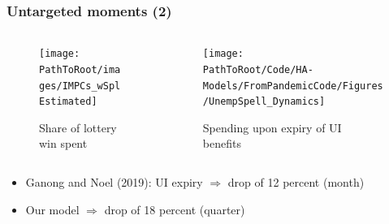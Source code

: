 \documentclass[pdflatex,aspectratio=169]{beamer}
\begin{document}
\begin{frame}
  \frametitle{Untargeted moments (2)}
  \begin{columns}
    \begin{column}{0.50\textwidth}
      \begin{figure}
        \texttt{[image: \\PathToRoot/images/IMPCs\_wSplEstimated]}
        \caption{Share of lottery win spent} 
      \end{figure}
    \end{column}
    \begin{column}{0.50\textwidth}
      \begin{figure}
        \texttt{[image: \\PathToRoot/Code/HA-Models/FromPandemicCode/Figures/UnempSpell\_Dynamics]}
        \caption{Spending upon expiry of UI benefits} 
      \end{figure}
    \end{column}
  \end{columns}
  \begin{itemize}
    \item
          Ganong and Noel (2019): UI expiry $\Rightarrow$ drop of 12 percent (month)
    \item
          Our model $\Rightarrow$ drop of 18 percent (quarter)
  \end{itemize}
\end{frame}
\end{document}
